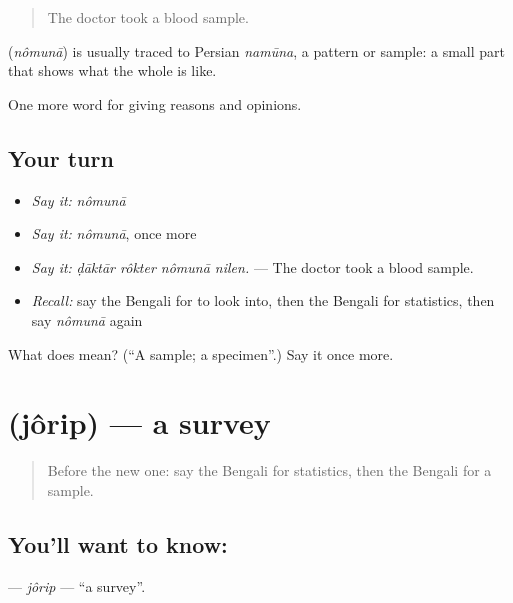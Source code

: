 \begin{quote}
The doctor took a blood sample.
\end{quote}

\begin{cousinweb}
\textbf{} (\emph{nômunā}) is usually traced to Persian \emph{namūna}, a pattern or sample: a small part that shows what the whole is like.
\end{cousinweb}

\begin{grammarlens}[title={What you've built}]
One more word for giving reasons and opinions.
\end{grammarlens}

\subsection*{Your turn}
\begin{itemize}
\raggedright
  \item \emph{Say it:} \emph{nômunā}
  \item \emph{Say it:} \emph{nômunā}, once more
  \item \emph{Say it:} \emph{ḍāktār rôkter nômunā nilen.} — The doctor took a blood sample.
  \item \emph{Recall:} say the Bengali for to look into, then the Bengali for statistics, then say \emph{nômunā} again
\end{itemize}

\begin{tcolorbox}[breakable,colback=teal!4,colframe=teal!35!black,title={Before you move on}]
What does  mean? (\textquotedblleft{}A sample; a specimen\textquotedblright{}.) Say it once more.
\end{tcolorbox}
\section[\texorpdfstring{\bn{জরিপ} (jôrip)}{জরিপ (jôrip)}]{ (jôrip) — a survey}

\label{lesson:BN-C355-jorip}



\begin{quote}
Before the new one: say the Bengali for statistics, then the Bengali for a sample.
\end{quote}

\subsection*{You'll want to know: }
\textbf{} — \emph{jôrip} — \textquotedblleft{}a survey\textquotedblright{}.

